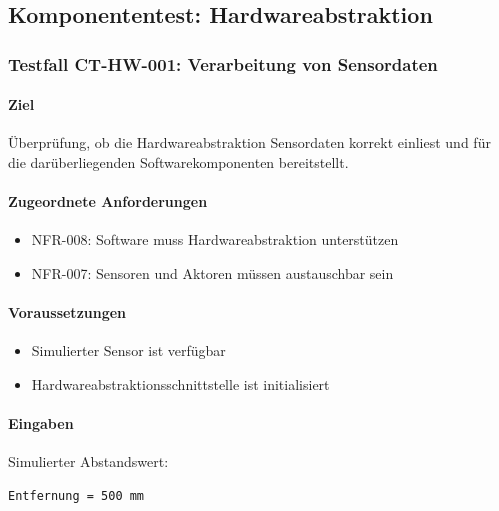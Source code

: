 \subsection{Komponententest:
Hardwareabstraktion}\label{komponententest-hardwareabstraktion}

\subsubsection{Testfall CT-HW-001: Verarbeitung von
Sensordaten}\label{testfall-ct-hw-001-verarbeitung-von-sensordaten}

\paragraph{Ziel}\label{ziel}

Überprüfung, ob die Hardwareabstraktion Sensordaten korrekt einliest und
für die darüberliegenden Softwarekomponenten bereitstellt.

\paragraph{Zugeordnete Anforderungen}\label{zugeordnete-anforderungen}

\begin{itemize}
\tightlist
\item
  NFR-008: Software muss Hardwareabstraktion unterstützen
\item
  NFR-007: Sensoren und Aktoren müssen austauschbar sein
\end{itemize}

\paragraph{Voraussetzungen}\label{voraussetzungen}

\begin{itemize}
\tightlist
\item
  Simulierter Sensor ist verfügbar
\item
  Hardwareabstraktionsschnittstelle ist initialisiert
\end{itemize}

\paragraph{Eingaben}\label{eingaben}

Simulierter Abstandswert:

\begin{verbatim}
Entfernung = 500 mm
\end{verbatim}

